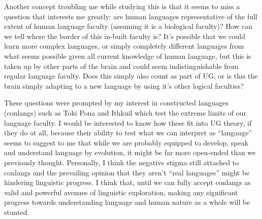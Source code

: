 \documentclass[a4paper,10pt]{article}
\begin{document}
Another concept troubling me while studying this is that it seems to miss a question that interests
me greatly: are human languages representative of the full extent of human language faculty (assuming
it is a biological faculty)? How can we tell where the border of this in-built faculty is? It's possible
that we could learn more complex languages, or simply completely different languages from what seems
possible given all current knowledge of human language, but this is taken up by other parts of the
brain and could seem indistinguishable from regular language faculty. Does this simply also count as
part of UG, or is this the brain simply adapting to a new language by using it's other logical
faculties?

These questions were prompted by my interest in constructed languages (conlangs) such as
Toki Pona \citep{Lang14} and Ithkuil \citep{Quijada11} which test the extreme limits of our language
faculty. I would be interested to know how these fit into UG theory, if they do at all, because their
ability to test what we can interpret as ``langauge'' seems to suggest to me that while we are probably
equipped to develop, speak and understand language by evolution, it might be far more open-ended than
we previously thought. Personally, I think the negative stigma still attached to conlangs and the
prevailing opinion that they aren't ``real languages'' might be hindering linguistic progress.
I think that, until we can fully accept conlangs as valid and powerful avenues of linguistic exploration,
making any significant progress towards understanding language and human nature as a whole will be
stunted.


\pagebreak


\end{document}
